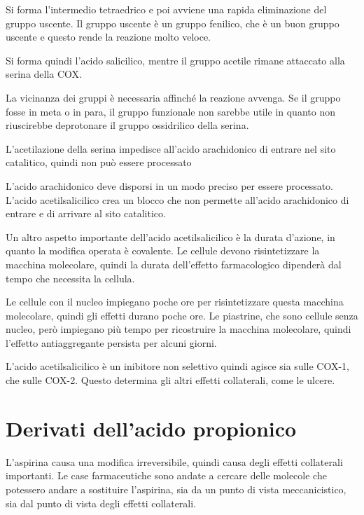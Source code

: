 Si forma l'intermedio tetraedrico e poi avviene una rapida eliminazione
del gruppo uscente. Il gruppo uscente è un gruppo fenilico, che è un
buon gruppo uscente e questo rende la reazione molto veloce.

Si forma quindi l'acido salicilico, mentre il gruppo acetile rimane
attaccato alla serina della COX.

La vicinanza dei gruppi è necessaria affinché la reazione avvenga. Se il
gruppo  fosse in meta o in para, il gruppo funzionale non sarebbe
utile in quanto non riuscirebbe deprotonare il gruppo ossidrilico della
serina.

L'acetilazione della serina impedisce all'acido arachidonico di entrare
nel sito catalitico, quindi non può essere processato


L'acido arachidonico deve disporsi in un modo preciso per essere
processato. L'acido acetilsalicilico crea un blocco che non permette
all'acido arachidonico di entrare e di arrivare al sito catalitico.


Un altro aspetto importante dell'acido acetilsalicilico è la durata
d'azione, in quanto la modifica operata è covalente. Le cellule devono
risintetizzare la macchina molecolare, quindi la durata dell'effetto
farmacologico dipenderà dal tempo che necessita la cellula.

Le cellule con il nucleo impiegano poche ore per risintetizzare questa
macchina molecolare, quindi gli effetti durano poche ore. Le piastrine,
che sono cellule senza nucleo, però impiegano più tempo per ricostruire
la macchina molecolare, quindi l'effetto antiaggregante persista per
alcuni giorni.

L'acido acetilsalicilico è un inibitore non selettivo quindi agisce sia
sulle COX-1, che sulle COX-2. Questo determina gli altri effetti
collaterali, come le ulcere.

\section{Derivati dell'acido propionico}

L'aspirina causa una modifica irreversibile, quindi causa degli effetti
collaterali importanti. Le case farmaceutiche sono andate a cercare
delle molecole che potessero andare a sostituire l'aspirina, sia da un
punto di vista meccanicistico, sia dal punto di vista degli effetti
collaterali.

